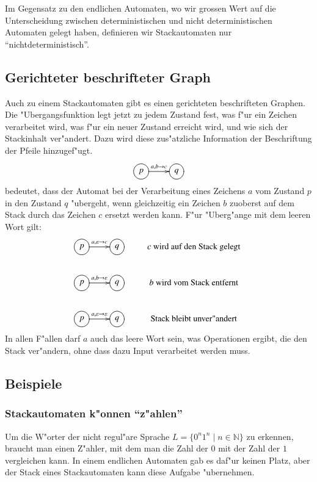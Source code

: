 Im Gegensatz zu den endlichen Automaten, wo wir grossen Wert auf die
Unterscheidung zwischen deterministischen und nicht deterministischen
Automaten gelegt haben, definieren wir Stackautomaten nur
``nichtdeterministisch''.

\subsection{Gerichteter beschrifteter Graph}
Auch zu einem Stackautomaten gibt es einen gerichteten beschrifteten
Graphen. Die "Ubergangsfunktion legt jetzt zu jedem Zustand 
fest, was f"ur ein Zeichen verarbeitet wird, was f"ur ein
neuer Zustand erreicht wird, und wie sich der Stackinhalt
ver"andert.
Dazu wird diese zus"atzliche Information der Beschriftung der Pfeile
hinzugef"ugt.
\[
\xymatrix{
*++[o][F]{p}\ar[r]^{a,b\to c}
	&*++[o][F]{q}
}
\]
bedeutet, dass der Automat bei der Verarbeitung eines Zeichens $a$
vom Zustand $p$ in den Zustand $q$ "ubergeht, wenn gleichzeitig
ein Zeichen $b$ zuoberst auf dem Stack durch das Zeichen $c$
ersetzt werden kann. F"ur "Uberg"ange mit dem leeren Wort gilt:
\[
\xymatrix{
*++[o][F]{p}\ar[r]^{a,\varepsilon\to c}
	&*++[o][F]{q}
		&\text{$c$ wird auf den Stack gelegt}
\\
*++[o][F]{p}\ar[r]^{a,b\to\varepsilon}
	&*++[o][F]{q}
		&\text{$b$ wird vom Stack entfernt}
\\
*++[o][F]{p}\ar[r]^{a,\varepsilon\to\varepsilon}
	&*++[o][F]{q}
		&\text{Stack bleibt unver"andert}
}
\]
In allen F"allen darf $a$ auch das leere Wort sein, was Operationen
ergibt, die den Stack ver"andern, ohne dass dazu Input verarbeitet werden
muss.


\subsection{Beispiele}
\subsubsection{Stackautomaten k"onnen ``z"ahlen''}
Um die W"orter der nicht regul"are Sprache $L=\{0^n1^n\;|\;n\in \mathbb N\}$
zu erkennen, braucht man einen Z"ahler, mit dem man die Zahl der $0$
mit der Zahl der $1$ vergleichen kann. In einem endlichen Automaten
gab es daf"ur keinen Platz, aber der Stack eines Stackautomaten kann
diese Aufgabe "ubernehmen.

